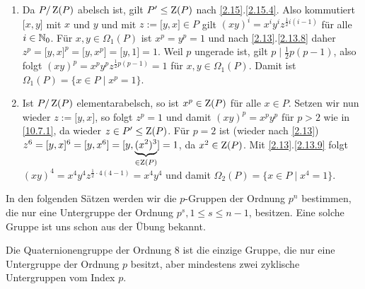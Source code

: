 \begin{beweis}\spspace
 \begin{enumerate}
  \item Da $P/\operatorname{Z}(P)$ abelsch ist, gilt $P'\leq \operatorname{Z}(P)$ nach \ref{2.15}.\ref{2.15.4}. Also kommutiert $\lbrack x,y\rbrack$ mit $x$ und $y$ und mit $z:=\lbrack y,x\rbrack\in P$ gilt $(xy)^i=x^iy^iz^{\frac{1}{2}i(i-1)}$ f\"ur alle $i\in \mathbb{N}_0$. F\"ur $x,y\in \Omega_1(P)$ ist $x^p=y^p=1$ und nach \ref{2.13}.\ref{2.13.8} daher $z^p=\lbrack y,x\rbrack^p=\lbrack y,x^p\rbrack=\lbrack y,1\rbrack =1$. Weil $p$ ungerade ist, gilt $p\mid\frac{1}{2}p(p-1)$, also folgt $(xy)^p=x^py^pz^{\frac{1}{2}p(p-1)}=1$ f\"ur $x,y\in \Omega_1(P)$. Damit ist $\Omega_1(P)=\lbrace x\in P\mid x^p=1\rbrace$.
 \item Ist $P/\operatorname{Z}(P)$ elementarabelsch, so ist $x^p\in \operatorname{Z}(P)$ f\"ur alle $x\in P$. Setzen wir nun wieder $z:=\lbrack y,x\rbrack$, so folgt $z^p=1$ und damit $(xy)^p=x^py^p$ f\"ur $p>2$ wie in \ref{10.7.1}, da wieder $z\in P'\leq \operatorname{Z}(P)$.
F\"ur $p=2$ ist (wieder nach \ref{2.13}) $z^6=\lbrack y,x\rbrack^6=\lbrack y,x^6\rbrack = \lbrack y,\underbrace{(x^2)^3}_{\in \operatorname{Z}(P)}\rbrack=1$, da $x^2\in \operatorname{Z}(P)$. Mit \ref{2.13}.\ref{2.13.9} folgt $(xy)^4=x^4y^4z^{\frac{1}{2}\cdot 4(4-1)}=x^4y^4$ und damit $\Omega_2(P) = \lbrace x\in P\mid x^4 =1\rbrace$.
 \end{enumerate}

\end{beweis}
In den folgenden S\"atzen werden wir die $p$-Gruppen der Ordnung $p^n$ bestimmen, die nur eine Untergruppe der Ordnung $p^s, 1\leq s\leq n-1$, besitzen. Eine solche Gruppe ist uns schon aus der \"Ubung bekannt.
\begin{satz}\label{10.8}
 Die Quaternionengruppe der Ordnung 8 ist die einzige Gruppe, die nur eine Untergruppe der Ordnung $p$ besitzt, aber mindestens zwei zyklische Untergruppen vom Index $p$.
\end{satz}
